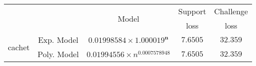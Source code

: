 \begin{tabular}{ccccc} 
\hline 
 &  & \multirow{2}{*}{Model} & Support & Challenge\tabularnewline 
 &  &  & loss  & loss\tabularnewline 
\hline 
\hline 
\multirow{2}{*}{cachet} & Exp. Model & $\mathbf{0.01998584\times 1.000019^{n}}$ & $\mathbf{7.6505}$ & $\mathbf{32.359}$ \tabularnewline 
 & Poly. Model & $0.01994556\times n^{0.0007578948}$ & $7.6505$ & $32.359$ \tabularnewline 
\hline 
\end{tabular} 

